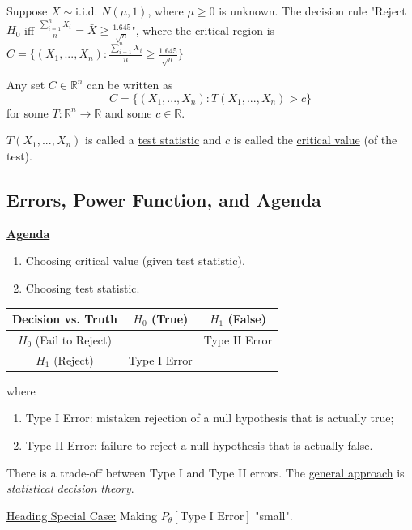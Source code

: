\documentclass[11pt]{elegantbook}
\begin{document}
\begin{enumerate}[$\bullet$]
\begin{enumerate}
    \end{enumerate}
    \begin{example}
        Suppose $X\sim \text{i.i.d. } N(\mu,1)$, where $\mu\geq 0$ is unknown. The decision rule "Reject $H_0$ iff $\frac{\sum_{i=1}^n X_i}{n}=\bar{X}\geq \frac{1.645}{\sqrt{n}}$", where the critical region is $C=\{(X_1,...,X_n):\frac{\sum_{i=1}^n X_i}{n}\geq \frac{1.645}{\sqrt{n}}\}$
    \end{example}
    \begin{proposition}
        Any set $C\in \mathbb{R}^n$ can be written as $$C=\{(X_1,...,X_n): T(X_1,...,X_n)>c\}$$ for some $T: \mathbb{R}^n \rightarrow \mathbb{R}$ and some $c\in \mathbb{R}$.
    \end{proposition}
    \begin{definition}
        \normalfont
        $T(X_1,...,X_n)$ is called a \underline{test statistic} and $c$ is called the \underline{critical value} (of the test).
    \end{definition}
\end{enumerate}

\subsection{Errors, Power Function, and Agenda}
\textbf{\underline{Agenda}}
\begin{enumerate}
    \item Choosing critical value (given test statistic).
    \item Choosing test statistic.
\end{enumerate}
\begin{definition}
    \normalfont
    \begin{center}
        \begin{tabular}{ccc}
            \hline
                Decision vs. Truth&$H_0$ (True) &$H_1$ (False)\\
            \hline
                $H_0$ (Fail to Reject)& &Type II Error\\
                $H_1$ (Reject)& Type I Error &\\
            \hline
        \end{tabular}
    \end{center}
    where
    \begin{enumerate}
        \item Type I Error: mistaken rejection of a null hypothesis that is actually true;
        \item Type II Error: failure to reject a null hypothesis that is actually false.
    \end{enumerate}
\end{definition}
There is a trade-off between Type I and Type II errors. The \underline{general approach} is \textit{statistical decision theory}.
\begin{example}
    \underline{Heading Special Case:} Making $P_\theta[\text{Type I Error}]$ "small".
\end{example}
\end{document}
